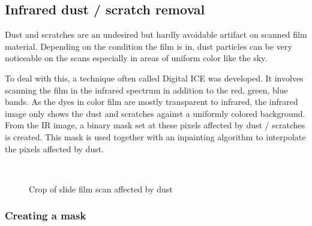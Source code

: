 \documentclass{article}
\begin{document}
\subsection{Infrared dust / scratch removal}
\label{ssec:imgproc_dice}

Dust and scratches are an undesired but hardly avoidable artifact on scanned film material. Depending
on the condition the film is in, dust particles can be very noticeable on the scans
especially in areas of uniform color like the sky.

To deal with this, a technique often called Digital ICE \cite{inpainting_dice} was developed. It involves
scanning the film in the infrared spectrum in addition to the red, green, blue bands.
As the dyes in color film are mostly transparent to infrared, the infrared image
only shows the dust and scratches against a uniformly colored background.
From the IR image, a binary mask set at these pixels affected by dust / scratches
is created. This mask is used together with an inpainting algorithm to interpolate
the pixels affected by dust.

\begin{figure}[H]
  \centering
  \caption{Crop of slide film scan affected by dust}
  
   \ 
\end{figure}

\subsubsection{Creating a mask}
\end{document}
